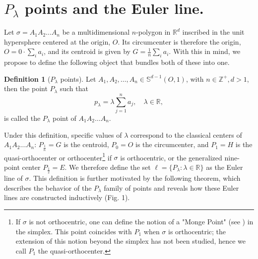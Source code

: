 \documentclass{birkjour}
\theoremstyle{definition}
\newtheorem{defn}[thm]{Definition}
\theoremstyle{remark}
\numberwithin{equation}{section}
\begin{document}
\section{$P_{\lambda}$ points and the Euler line.}

Let $\sigma = A_1A_2\ldots A_n$ be a multidimensional $n$-polygon in $\mathbb{R}^d$ inscribed in the unit hypersphere centered at the origin, $O$. Its circumcenter is therefore the origin, $O = 0 \cdot \sum_{i} a_i$, and its centroid is given by $G = \frac{1}{n} \sum_{i} a_i$. With this in mind, we propose to define the following object that bundles both of these into one.

\begin{defn}[$P_{\lambda}$ points] Let $A_1, A_2, \ldots, A_n \in \mathbb{S}^{d-1}(O,1)$, with $n \in \mathbb{Z}^+, d > 1$, then the point $P_{\lambda}$ such that \begin{equation}
    p_{\lambda} = \lambda \sum_{j=1}^{n} a_j, \quad \lambda \in \mathbb{R},
\end{equation}
    is called the $P_{\lambda}$ point of $A_1A_2\ldots A_n$. 
\end{defn}

Under this definition, specific values of $\lambda$ correspond to the classical centers of $A_1A_2\ldots A_n$: $P_{\frac{1}{n}} = G$ is the centroid, $P_{0}=O$ is the circumcenter, and $P_{1}=H$ is the quasi-orthocenter or orthocenter\footnote{If $\sigma$ is not orthocentric, one can define the notion of a "Monge Point" (see \cite{Buba}) in the simplex. This point coincides with $P_1$ when $\sigma$ is orthocentric; the extension of this notion beyond the simplex has not been studied, hence we call $P_1$ the quasi-orthocenter.} if $\sigma$ is orthocentric, or the generalized nine-point center $P_{\frac{1}{2}} = E$. We therefore define the set $ \ell = \{ P_{\lambda} : \lambda \in \mathbb{R} \}$ as the Euler line of $\sigma$. This definition is further motivated by the following theorem, which describes the behavior of the $P_{\lambda}$ family of points and reveals how these Euler lines are constructed inductively (Fig. 1).
\end{document}
